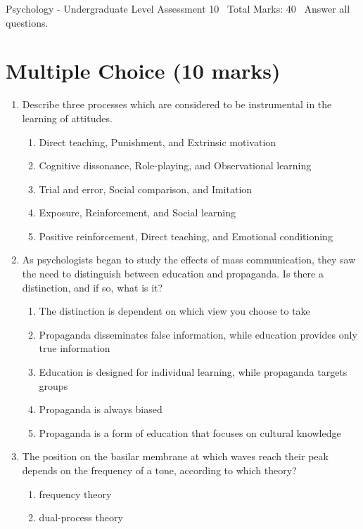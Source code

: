 \documentclass[12pt]{article}
\begin{document}
\begin{center}
Psychology - Undergraduate Level Assessment 10 \
Total Marks: 40 \
Answer all questions.
\end{center}

\section*{Multiple Choice (10 marks)}
\begin{enumerate}[label=\arabic*.]
\item Describe three processes which are considered to be instrumental in the learning of attitudes.
\begin{enumerate}[label=(\alph*)]
    \item Direct teaching, Punishment, and Extrinsic motivation
    \item Cognitive dissonance, Role-playing, and Observational learning
    \item Trial and error, Social comparison, and Imitation
    \item Exposure, Reinforcement, and Social learning
    \item Positive reinforcement, Direct teaching, and Emotional conditioning
\end{enumerate}
\item As psychologists began to study the effects of mass communication, they saw the need to distinguish between education and propaganda. Is there a distinction, and if so, what is it?
\begin{enumerate}[label=(\alph*)]
    \item The distinction is dependent on which view you choose to take
    \item Propaganda disseminates false information, while education provides only true information
    \item Education is designed for individual learning, while propaganda targets groups
    \item Propaganda is always biased
    \item Propaganda is a form of education that focuses on cultural knowledge
\end{enumerate}
\item The position on the basilar membrane at which waves reach their peak depends on the frequency of a tone, according to which theory?
\begin{enumerate}[label=(\alph*)]
    \item frequency theory
    \item dual-process theory

\end{enumerate}
\end{enumerate}
\end{document}

